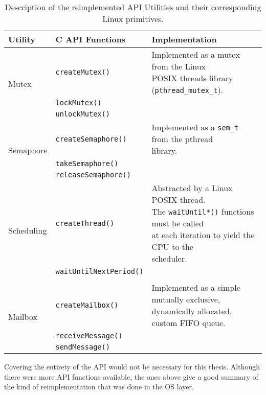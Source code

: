 {\begin{table}[htbp]
	\vspace{12pt}
	\centering
	\begin{tabularx}{\linewidth}{l l X}
		\toprule
		{\bfseries Utility} & \textbf{C API Functions} & \textbf{Implementation}\\
		\midrule
		\multirow{3}{*}{Mutex}  & \texttt{createMutex()}  & \multirowcell{3}[0pt][l]{Implemented as a mutex from the Linux\\ POSIX threads library (\texttt{pthread_mutex_t}).}\\								
		&\texttt{lockMutex()}&\\
		&\texttt{unlockMutex()}&\\
		\midrule
		\multirow{3}{*}{Semaphore}  & \texttt{createSemaphore()}  & \multirowcell{3}[0pt][l]{Implemented as a \texttt{sem_t} from the pthread\\ library.}\\								
		&\texttt{takeSemaphore()}&\\
		&\texttt{releaseSemaphore()}&\\
		\midrule
		\multirow{3}{*}{Scheduling} & \texttt{createThread()}  & \multirowcell{3}[0pt][l]{Abstracted by a Linux POSIX thread.\\ The \texttt{waitUntil*()} functions must be called\\ at each iteration to yield the CPU to the\\ scheduler.}\\
		&\texttt{waitUntilNextPeriod()}&\\		
		& &\\
		\midrule
		\multirow{3}{*}{Mailbox} & \texttt{createMailbox()}  & \multirowcell{3}[0pt][l]{Implemented as a simple mutually exclusive,\\ dynamically allocated, custom FIFO queue.}\\
		&\texttt{receiveMessage()}&\\
		&\texttt{sendMessage()}&\\
		\bottomrule
	\end{tabularx}
	\caption{Description of the reimplemented API Utilities and their corresponding Linux primitives.}
	\label{tab:does-api}
\end{table}
Covering the entirety of the API would not be necessary for this thesis. Although there were more API functions available, the ones above give a good summary of the kind of reimplementation that was done in the OS layer.

}
